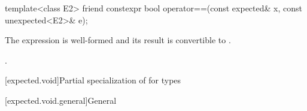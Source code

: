 %
\begin{itemdecl}
template<class E2> friend constexpr bool operator==(const expected& x, const unexpected<E2>& e);
\end{itemdecl}

\begin{itemdescr}
\pnum
\mandates
The expression  is well-formed and
its result is convertible to .

\pnum
\returns
{}.
\end{itemdescr}

[expected.void]{Partial specialization of  for  types}

[expected.void.general]{General}


